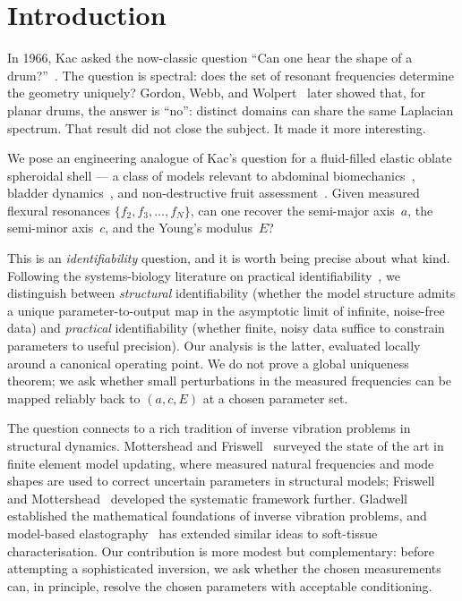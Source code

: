 \section{Introduction}\label{sec:introduction}

In 1966, Kac asked the now-classic question ``Can one hear the shape of a
drum?''~\cite{Kac1966}.  The question is spectral: does the set of resonant
frequencies determine the geometry uniquely?  Gordon, Webb, and
Wolpert~\cite{Gordon1992} later showed that, for planar drums, the answer is
``no'': distinct domains can share the same Laplacian spectrum.  That result
did not close the subject.  It made it more interesting.

We pose an engineering analogue of Kac's question for a fluid-filled elastic
oblate spheroidal shell --- a class of models relevant to abdominal
biomechanics~\cite{BrowntoneCompanion}, bladder
dynamics~\cite{BrowntoneBladder}, and non-destructive fruit
assessment~\cite{BrowntoneWatermelon}.  Given measured flexural resonances
$\{f_2,f_3,\ldots,f_N\}$, can one recover the semi-major axis~$a$, the
semi-minor axis~$c$, and the Young's modulus~$E$?

This is an \emph{identifiability} question, and it is worth being precise
about what kind.  Following the systems-biology literature on practical
identifiability~\cite{Raue2009,Wieland2021,Chis2011}, we distinguish between
\emph{structural} identifiability (whether the model structure admits a
unique parameter-to-output map in the asymptotic limit of infinite, noise-free
data) and \emph{practical} identifiability (whether finite, noisy data
suffice to constrain parameters to useful precision).  Our analysis is the
latter, evaluated locally around a canonical operating point.  We do not prove
a global uniqueness theorem; we ask whether small perturbations in the
measured frequencies can be mapped reliably back to $(a,c,E)$ at a chosen
parameter set.

The question connects to a rich tradition of inverse vibration problems in
structural dynamics.  Mottershead and Friswell~\cite{MottersheadFriswell1993}
surveyed the state of the art in finite element model updating, where measured
natural frequencies and mode shapes are used to correct uncertain parameters in
structural models; Friswell and Mottershead~\cite{FriswellMottershead1995}
developed the systematic framework further.  Gladwell~\cite{Gladwell2004,Gladwell2005}
established the mathematical foundations of inverse vibration problems, and
model-based elastography~\cite{Doyley2012} has extended similar ideas to
soft-tissue characterisation.  Our contribution is more modest but
complementary: before attempting a sophisticated inversion, we ask whether the
chosen measurements can, in principle, resolve the chosen parameters with
acceptable conditioning.

